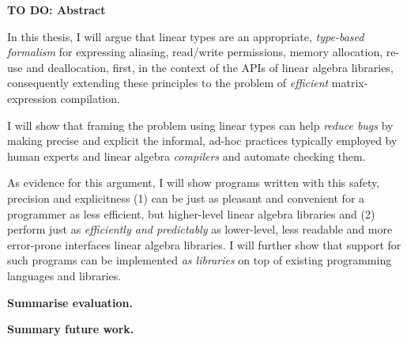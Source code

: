 \newpage
{\normalfont\Huge\sffamily\bfseries TO DO: Abstract}
\vspace{24pt}

In this thesis, I will argue that linear types are an appropriate,
\emph{type-based formalism} for expressing aliasing, read/write permissions,
memory allocation, re-use and deallocation, first, in the context of the APIs
of linear algebra libraries, consequently extending these principles to the
problem of \emph{efficient} matrix-expression compilation.

I will show that framing the problem using linear types can help \emph{reduce
bugs} by making precise and explicit the informal, ad-hoc practices typically
employed by human experts and linear algebra \emph{compilers} and automate
checking them.

As evidence for this argument, I will show programs written with this safety,
precision and explicitness (1) can be just as pleasant and convenient for a
programmer as less efficient, but higher-level linear algebra libraries and (2)
perform just as \emph{efficiently and predictably} as lower-level, less
readable and more error-prone interfaces linear algebra libraries. I will
further show that support for such programs can be implemented \emph{as
libraries} on top of existing programming languages and libraries.

\textbf{Summarise evaluation.}

\textbf{Summary future work.}

\newpage
\vspace*{\fill}
